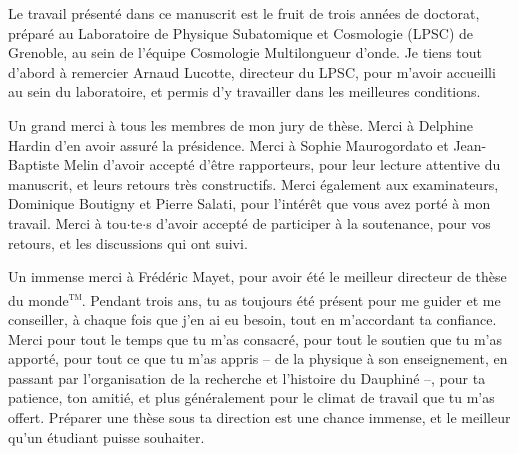 Le travail présenté dans ce manuscrit est le fruit de trois années de doctorat, préparé au Laboratoire de Physique Subatomique et Cosmologie (LPSC) de Grenoble, au sein de l'équipe Cosmologie Multilongueur d'onde.
Je tiens tout d'abord à remercier Arnaud Lucotte, directeur du LPSC, pour m'avoir accueilli au sein du laboratoire, et permis d'y travailler dans les meilleures conditions.

Un grand merci à tous les membres de mon jury de thèse.
Merci à Delphine Hardin d'en avoir assuré la présidence.
Merci à Sophie Maurogordato et Jean-Baptiste Melin d'avoir accepté d'être rapporteurs, pour leur lecture attentive du manuscrit, et leurs retours très constructifs.
Merci également aux examinateurs, Dominique Boutigny et Pierre Salati, pour l'intérêt que vous avez porté à mon travail.
Merci à tou$\cdot$te$\cdot$s d'avoir accepté de participer à la soutenance, pour vos retours, et les discussions qui ont suivi.

Un immense merci à Frédéric Mayet, pour avoir été le meilleur directeur de thèse du monde\textsuperscript{\textsc{tm}}.
Pendant trois ans, tu as toujours été présent pour me guider et me conseiller, à chaque fois que j'en ai eu besoin, tout en m'accordant ta confiance.
Merci pour tout le temps que tu m'as consacré, pour tout le soutien que tu m'as apporté, pour tout ce que tu m'as appris -- de la physique à son enseignement, en passant par l'organisation de la recherche et l'histoire du Dauphiné --, pour ta patience, ton amitié, et plus généralement pour le climat de travail que tu m'as offert.
Préparer une thèse sous ta direction est une chance immense, et le meilleur qu'un étudiant puisse souhaiter.

